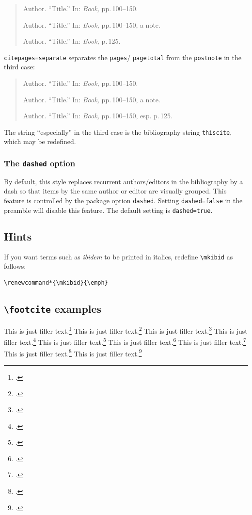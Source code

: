 \documentclass[a4paper]{article}
\newcommand{\cmd}[1]{\texttt{\textbackslash #1}}
\begin{document}
\begin{quote}
Author. \enquote{Title.} In: \emph{Book,} pp.\,100--150.

Author. \enquote{Title.} In: \emph{Book,} pp.\,100--150, a note.

Author. \enquote{Title.} In: \emph{Book,} p.\,125.
\end{quote}
%
\texttt{citepages=separate} separates the \texttt{pages}\slash
\texttt{pagetotal} from the \texttt{postnote} in the third case:

\begin{quote}
Author. \enquote{Title.} In: \emph{Book,} pp.\,100--150.

Author. \enquote{Title.} In: \emph{Book,} pp.\,100--150, a note.

Author. \enquote{Title.} In: \emph{Book,} pp.\,100--150, esp. p.\,125.
\end{quote}
%
The string \enquote{especially} in the third case is the bibliography
string \texttt{thiscite}, which may be redefined.

\subsubsection*{The \texttt{dashed} option}

By default, this style replaces recurrent authors/editors in the
bibliography by a dash so that items by the same author or editor
are visually grouped. This feature is controlled by the package
option \texttt{dashed}. Setting \texttt{dashed=false} in the
preamble will disable this feature. The default setting is
\texttt{dashed=true}.

\subsection*{Hints}

If you want terms such as \emph{ibidem} to be printed in italics,
redefine \cmd{mkibid} as follows:

\begin{verbatim}
\renewcommand*{\mkibid}{\emph}
\end{verbatim}

\clearpage

\subsection*{\cmd{footcite} examples}

This is just filler text.\footcite{aristotle:anima}
This is just filler text.\footcite{averroes/bland}
This is just filler text.\footcite[26]{aristotle:anima}
This is just filler text.\footcite[59--61]{averroes/bland}
This is just filler text.\footcite{aristotle:physics}
This is just filler text.\footcite{aristotle:anima}
This is just filler text.\footcite[55]{aristotle:physics}
This is just filler text.\footcite[25]{aristotle:physics}
This is just filler text.\footcite[25]{aristotle:physics}
\end{document}
